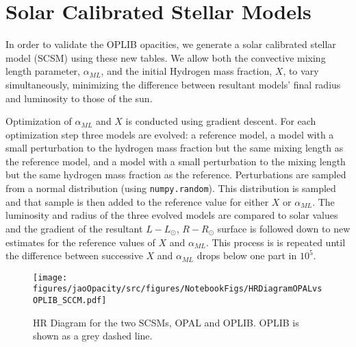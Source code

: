 \section{Solar Calibrated Stellar Models}\label{sec:SCSM}


In order to validate the OPLIB opacities, we generate a solar calibrated
stellar model (SCSM) using these new tables. We allow both the convective
mixing length parameter, $\alpha_{ML}$, and the initial Hydrogen mass fraction,
$X$, to vary simultaneously, minimizing the difference between resultant
models' final radius and luminosity to those of the sun.

Optimization of $\alpha_{ML}$ and $X$ is conducted using gradient descent. For
each optimization step three models are evolved: a reference model, a model
with a small perturbation to the hydrogen mass fraction but the same mixing
length as the reference model, and a model with a small perturbation to the
mixing length but the same hydrogen mass fraction as the reference.
Perturbations are sampled from a normal distribution (using
\texttt{numpy.random}). This distribution is sampled and that sample is then
added to the reference value for either $X$ or $\alpha_{ML}$. The luminosity
and radius of the three evolved models are compared to solar values and the
gradient of the resultant $L-L_{\odot}$, $R-R_{\odot}$ surface is followed down
to new estimates for the reference values of $X$ and $\alpha_{ML}$. This
process is is repeated until the difference between successive $X$ and
$\alpha_{ML}$ drops below one part in $10^{5}$.

\begin{figure}
	\centering
	\texttt{[image: figures/jaoOpacity/src/figures/NotebookFigs/HRDiagramOPALvsOPLIB\_SCCM.pdf]}
	\caption{HR Diagram for the two SCSMs, OPAL and OPLIB. OPLIB is shown as a grey
	dashed line.}
	\label{fig:OPLIBOPALHR}
\end{figure}

